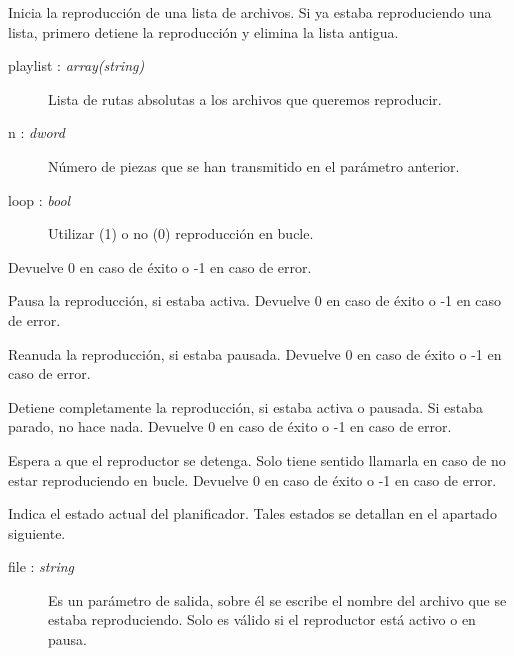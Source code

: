 \begin{description}[style=nextline]
	\item[player\_start (playlist, n, loop) : \textit{dword}]
	Inicia la reproducción de una lista de archivos. Si ya estaba reproduciendo una lista, primero detiene la reproducción y elimina la lista antigua.
	
	\begin{description}
		\item[playlist : \textit{array(string)}] Lista de rutas absolutas a los archivos que queremos reproducir.
		\item[n : \textit{dword}] Número de piezas que se han transmitido en el parámetro anterior.
		\item[loop : \textit{bool}] Utilizar (1) o no (0) reproducción en bucle.
	\end{description}
	
	Devuelve 0 en caso de éxito o -1 en caso de error.
	
	\item[player\_pause () : \textit{dword}]
	Pausa la reproducción, si estaba activa. Devuelve 0 en caso de éxito o -1 en caso de error.
	
	\item[player\_resume () : \textit{dword}]
	Reanuda la reproducción, si estaba pausada. Devuelve 0 en caso de éxito o -1 en caso de error.
	
	\item[player\_stop () : \textit{dword}]
	Detiene completamente la reproducción, si estaba activa o pausada. Si estaba parado, no hace nada. Devuelve 0 en caso de éxito o -1 en caso de error.
	
	\item[player\_wait () : \textit{dword}]
	Espera a que el reproductor se detenga. Solo tiene sentido llamarla en caso de no estar reproduciendo en bucle. Devuelve 0 en caso de éxito o -1 en caso de error.
	
	\item[player\_state (file) : \textit{enum}]
	Indica el estado actual del planificador. Tales estados se detallan en el apartado siguiente.
	
	\begin{description}
		\item[file : \textit{string}] Es un parámetro de salida, sobre él se escribe el nombre del archivo que se estaba reproduciendo. Solo es válido si el reproductor está activo o en pausa.
	\end{description}
	

\end{description}
